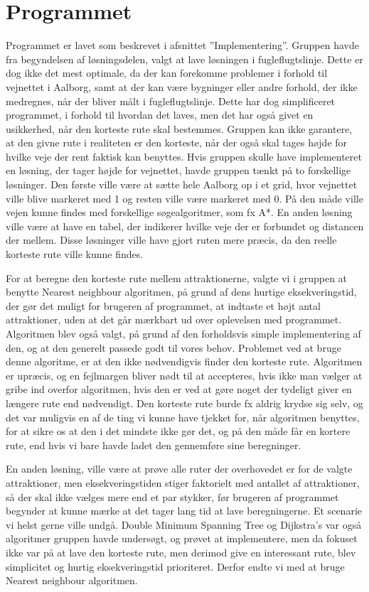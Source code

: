 \section{Programmet}
Programmet er lavet som beskrevet i afsnittet ”Implementering”. Gruppen havde fra begyndelsen af løsningsdelen, valgt at lave løsningen i fugleflugtslinje. Dette er dog ikke det mest optimale, da der kan forekomme problemer i forhold til vejnettet i Aalborg, samt at der kan være bygninger eller andre forhold, der ikke medregnes, når der bliver målt i fugleflugtslinje. Dette har dog simplificeret programmet, i forhold til hvordan det laves, men det har også givet en usikkerhed, når den korteste rute skal bestemmes. Gruppen kan ikke garantere, at den givne rute i realiteten er den korteste, når der også skal tages højde for hvilke veje der rent faktisk kan benyttes. \newline
Hvis gruppen skulle have implementeret en løsning, der tager højde for vejnettet, havde gruppen tænkt på to forskellige løsninger. Den første ville være at sætte hele Aalborg op i et grid, hvor vejnettet ville blive markeret med 1 og resten ville være markeret med 0. På den måde ville vejen kunne findes med forskellige søgealgoritmer, som fx A*. En anden løsning ville være at have en tabel, der indikerer hvilke veje der er forbundet og distancen der mellem. Disse løsninger ville have gjort ruten mere præcis, da den reelle korteste rute ville kunne findes. 

For at beregne den korteste rute mellem attraktionerne, valgte vi i gruppen at benytte Nearest neighbour algoritmen, på grund af dens hurtige eksekveringstid, der gør det muligt for brugeren af programmet, at indtaste et højt antal attraktioner, uden at det går mærkbart ud over oplevelsen med programmet. Algoritmen blev også valgt, på grund af den forholdsvis simple implementering af den, og at den generelt passede godt til vores behov. Problemet ved at bruge denne algoritme, er at den ikke nødvendigvis finder den korteste rute. Algoritmen er upræcis, og en fejlmargen bliver nødt til at accepteres, hvis ikke man vælger at gribe ind overfor algoritmen, hvis den er ved at gøre noget der tydeligt giver en længere rute end nødvendigt. Den korteste rute burde fx aldrig krydse sig selv, og det var muligvis en af de ting vi kunne have tjekket for, når algoritmen benyttes, for at sikre os at den i det mindste ikke gør det, og på den måde får en kortere rute, end hvis vi bare havde ladet den gennemføre sine beregninger. 

En anden løsning, ville være at prøve alle ruter der overhovedet er for de valgte attraktioner, men eksekveringstiden stiger faktorielt med antallet af attraktioner, så der skal ikke vælges mere end et par stykker, før brugeren af programmet begynder at kunne mærke at det tager lang tid at lave beregningerne. Et scenarie vi helst gerne ville undgå.
Double Minimum Spanning Tree og Dijkstra’s var også algoritmer gruppen havde undersøgt, og prøvet at implementere, men da fokuset ikke var på at lave den korteste rute, men derimod give en interessant rute, blev simplicitet og hurtig eksekveringstid prioriteret. Derfor endte vi med at bruge Nearest neighbour algoritmen.
